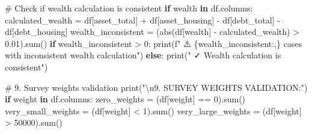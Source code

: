 \documentclass[
  letterpaper,
  DIV=11,
  numbers=noendperiod]{scrartcl}
\newenvironment{Shaded}{\begin{snugshade}}{\end{snugshade}}
\newcommand{\BuiltInTok}[1]{\textcolor[rgb]{0.00,0.23,0.31}{#1}}
\newcommand{\CharTok}[1]{\textcolor[rgb]{0.13,0.47,0.30}{#1}}
\newcommand{\CommentTok}[1]{\textcolor[rgb]{0.37,0.37,0.37}{#1}}
\newcommand{\ControlFlowTok}[1]{\textcolor[rgb]{0.00,0.23,0.31}{\textbf{#1}}}
\newcommand{\DecValTok}[1]{\textcolor[rgb]{0.68,0.00,0.00}{#1}}
\newcommand{\FloatTok}[1]{\textcolor[rgb]{0.68,0.00,0.00}{#1}}
\newcommand{\KeywordTok}[1]{\textcolor[rgb]{0.00,0.23,0.31}{\textbf{#1}}}
\newcommand{\NormalTok}[1]{\textcolor[rgb]{0.00,0.23,0.31}{#1}}
\newcommand{\OperatorTok}[1]{\textcolor[rgb]{0.37,0.37,0.37}{#1}}
\newcommand{\SpecialCharTok}[1]{\textcolor[rgb]{0.37,0.37,0.37}{#1}}
\newcommand{\SpecialStringTok}[1]{\textcolor[rgb]{0.13,0.47,0.30}{#1}}
\newcommand{\StringTok}[1]{\textcolor[rgb]{0.13,0.47,0.30}{#1}}
\begin{document}
\begin{Shaded}
\begin{Highlighting}[]
\CommentTok{\# Check if wealth calculation is consistent}
\ControlFlowTok{if} \StringTok{\textquotesingle{}wealth\textquotesingle{}} \KeywordTok{in}\NormalTok{ df.columns:}
\NormalTok{    calculated\_wealth }\OperatorTok{=}\NormalTok{ df[}\StringTok{\textquotesingle{}asset\_total\textquotesingle{}}\NormalTok{] }\OperatorTok{+}\NormalTok{ df[}\StringTok{\textquotesingle{}asset\_housing\textquotesingle{}}\NormalTok{] }\OperatorTok{{-}}\NormalTok{ df[}\StringTok{\textquotesingle{}debt\_total\textquotesingle{}}\NormalTok{] }\OperatorTok{{-}}\NormalTok{ df[}\StringTok{\textquotesingle{}debt\_housing\textquotesingle{}}\NormalTok{]}
\NormalTok{    wealth\_inconsistent }\OperatorTok{=}\NormalTok{ (}\BuiltInTok{abs}\NormalTok{(df[}\StringTok{\textquotesingle{}wealth\textquotesingle{}}\NormalTok{] }\OperatorTok{{-}}\NormalTok{ calculated\_wealth) }\OperatorTok{\textgreater{}} \FloatTok{0.01}\NormalTok{).}\BuiltInTok{sum}\NormalTok{()}
    \ControlFlowTok{if}\NormalTok{ wealth\_inconsistent }\OperatorTok{\textgreater{}} \DecValTok{0}\NormalTok{:}
        \BuiltInTok{print}\NormalTok{(}\SpecialStringTok{f"   ⚠️ }\SpecialCharTok{\{}\NormalTok{wealth\_inconsistent}\SpecialCharTok{:,\}}\SpecialStringTok{ cases with inconsistent wealth calculation"}\NormalTok{)}
    \ControlFlowTok{else}\NormalTok{:}
        \BuiltInTok{print}\NormalTok{(}\StringTok{"   ✓ Wealth calculation is consistent"}\NormalTok{)}

\CommentTok{\# 9. Survey weights validation}
\BuiltInTok{print}\NormalTok{(}\StringTok{"}\CharTok{\textbackslash{}n}\StringTok{9. SURVEY WEIGHTS VALIDATION:"}\NormalTok{)}
\ControlFlowTok{if} \StringTok{\textquotesingle{}weight\textquotesingle{}} \KeywordTok{in}\NormalTok{ df.columns:}
\NormalTok{    zero\_weights }\OperatorTok{=}\NormalTok{ (df[}\StringTok{\textquotesingle{}weight\textquotesingle{}}\NormalTok{] }\OperatorTok{==} \DecValTok{0}\NormalTok{).}\BuiltInTok{sum}\NormalTok{()}
\NormalTok{    very\_small\_weights }\OperatorTok{=}\NormalTok{ (df[}\StringTok{\textquotesingle{}weight\textquotesingle{}}\NormalTok{] }\OperatorTok{\textless{}} \DecValTok{1}\NormalTok{).}\BuiltInTok{sum}\NormalTok{()}
\NormalTok{    very\_large\_weights }\OperatorTok{=}\NormalTok{ (df[}\StringTok{\textquotesingle{}weight\textquotesingle{}}\NormalTok{] }\OperatorTok{\textgreater{}} \DecValTok{50000}\NormalTok{).}\BuiltInTok{sum}\NormalTok{()}
    

\end{Highlighting}
\end{Shaded}
\end{document}

